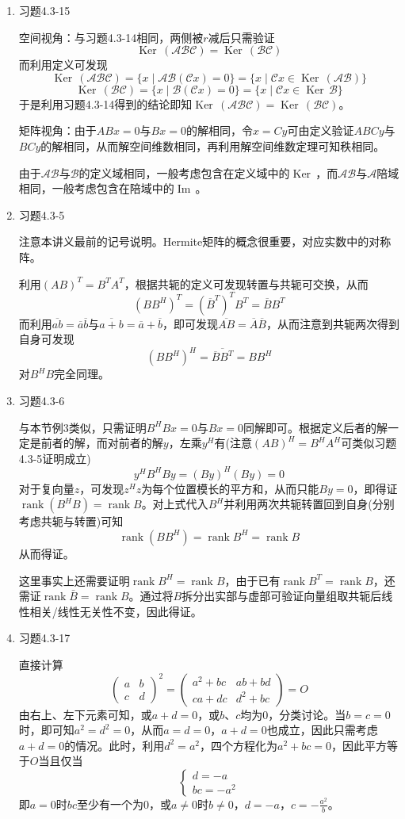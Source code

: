 \documentclass[a4paper,UTF8,fontset=windows]{ctexart}
\DeclareMathOperator{\rank}{rank}
\DeclareMathOperator{\im}{Im\,}
\DeclareMathOperator{\Ker}{Ker\,}
\newcommand*{\ma}{\mathcal{A}}
\newcommand*{\mb}{\mathcal{B}}
\newcommand*{\mc}{\mathcal{C}}
\newcommand*{\note}{\noindent *}
\begin{document}
\begin{enumerate}
    \item 习题4.3-15
    
    空间视角：与习题4.3-14相同，两侧被$r$减后只需验证
    $$\Ker(\ma\mb\mc)=\Ker(\mb\mc)$$
    而利用定义可发现
    $$\Ker(\ma\mb\mc)=\{x\mid\ma\mb(\mc x)=0\}=\{x\mid\mc x\in\Ker(\ma\mb)\}$$
    $$\Ker(\mb\mc)=\{x\mid\mb(\mc x)=0\}=\{x\mid\mc x\in\Ker\mb\}$$
    于是利用习题4.3-14得到的结论即知$\Ker(\ma\mb\mc)=\Ker(\mb\mc)$。

    矩阵视角：由于$ABx=0$与$Bx=0$的解相同，令$x=Cy$可由定义验证$ABCy$与$BCy$的解相同，从而解空间维数相同，再利用解空间维数定理可知秩相同。

    \note 由于$\ma\mb$与$\mb$的定义域相同，一般考虑包含在定义域中的$\Ker$，而$\ma\mb$与$\ma$陪域相同，一般考虑包含在陪域中的$\im$。

    \item 习题4.3-5
    
    \note 注意本讲义最前的记号说明。Hermite矩阵的概念很重要，对应实数中的对称阵。

    利用$(AB)^T=B^TA^T$，根据共轭的定义可发现转置与共轭可交换，从而
    $$(BB^H)^T=(\overline{B}^T)^TB^T=\overline{B}B^T$$
    而利用$\overline{ab}=\overline{a}\overline{b}$与$\overline{a+b}=\overline{a}+\overline{b}$，即可发现$\overline{AB}=\overline{A}\overline{B}$，从而注意到共轭两次得到自身可发现
    $$(BB^H)^H=\overline{\overline{B}B^T}=BB^H$$
    对$B^HB$完全同理。

    \item 习题4.3-6
    
    与本节例3类似，只需证明$B^HBx=0$与$Bx=0$同解即可。根据定义后者的解一定是前者的解，而对前者的解$y$，左乘$y^H$有(注意$(AB)^H=B^HA^H$可类似习题4.3-5证明成立)
    $$y^HB^HBy=(By)^H(By)=0$$
    对于复向量$z$，可发现$z^Hz$为每个位置模长的平方和，从而只能$By=0$，即得证$\rank(B^HB)=\rank B$。对上式代入$B^H$并利用两次共轭转置回到自身(分别考虑共轭与转置)可知
    $$\rank(BB^H)=\rank B^H=\rank B$$
    从而得证。

    \note 这里事实上还需要证明$\rank B^H=\rank B$，由于已有$\rank B^T=\rank B$，还需证$\rank\bar{B}=\rank B$。通过将$B$拆分出实部与虚部可验证向量组取共轭后线性相关/线性无关性不变，因此得证。

    \item 习题4.3-17
    
    直接计算
    $$\begin{pmatrix}a&b\\c&d\end{pmatrix}^2=\begin{pmatrix}a^2+bc&ab+bd\\ca+dc&d^2+bc\end{pmatrix}=O$$
    由右上、左下元素可知，或$a+d=0$，或$b$、$c$均为0，分类讨论。当$b=c=0$时，即可知$a^2=d^2=0$，从而$a=d=0$，$a+d=0$也成立，因此只需考虑$a+d=0$的情况。此时，利用$d^2=a^2$，四个方程化为$a^2+bc=0$，因此平方等于$O$当且仅当
    $$\begin{cases}d=-a\\bc=-a^2\end{cases}$$
    即$a=0$时$bc$至少有一个为0，或$a\ne0$时$b\ne0$，$d=-a$，$c=-\frac{a^2}{b}$。


\end{enumerate}
\end{document}
